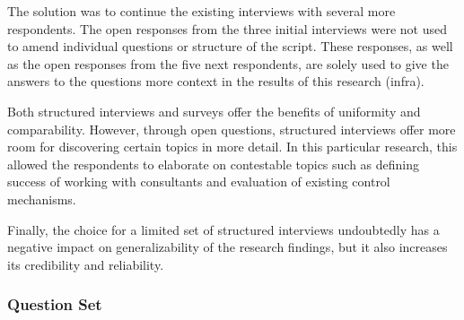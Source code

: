 \documentclass[12pt]{article}
\begin{document}
The solution was to continue the existing interviews with several more
respondents. The open responses from the three initial interviews were
not used to amend individual questions or structure of the script. These
responses, as well as the open responses from the five next respondents,
are solely used to give the answers to the questions more context in the
results of this research (infra).

Both structured interviews and surveys offer the benefits of uniformity
and comparability. However, through open questions, structured
interviews offer more room for discovering certain topics in more
detail. In this particular research, this allowed the respondents to
elaborate on contestable topics such as defining success of working with
consultants and evaluation of existing control mechanisms.

Finally, the choice for a limited set of structured interviews
undoubtedly has a negative impact on generalizability of the research
findings, but it also increases its credibility and reliability.

\subsubsection{Question Set}\label{question-set}
\end{document}
